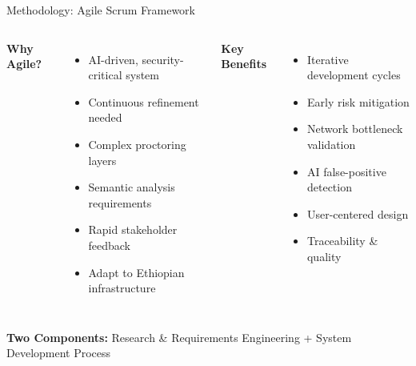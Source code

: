 \begin{frame}{Methodology: Agile Scrum Framework}
    \begin{columns}
        \textbf{Why Agile?}
        \begin{itemize}
            \item AI-driven, security-critical system
            \item Continuous refinement needed
            \item Complex proctoring layers
            \item Semantic analysis requirements
            \item Rapid stakeholder feedback
            \item Adapt to Ethiopian infrastructure
        \end{itemize}
        
        \textbf{Key Benefits}
        \begin{itemize}
            \item Iterative development cycles
            \item Early risk mitigation
            \item Network bottleneck validation
            \item AI false-positive detection
            \item User-centered design
            \item Traceability \& quality
        \end{itemize}
    \end{columns}
    
    \vspace{0.5cm}
    \begin{center}
        \textbf{Two Components:} Research \& Requirements Engineering + System Development Process
    \end{center}
\end{frame}

